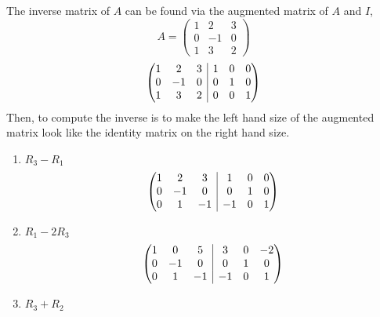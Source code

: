 \documentclass[diffeq.tex]{subfiles}
\begin{document}
    \begin{example}
        The inverse matrix of $A$ can be found via the augmented matrix of $A$ and $I$,
        \begin{equation}
            A = \begin{pmatrix}
                1 & 2 & 3\\
                0 & -1 & 0\\
                1 & 3 & 2
            \end{pmatrix}
        \end{equation}
        \begin{equation}
            \left(\begin{array}{@{}ccc|ccc@{}}
                1 & 2 & 3 & 1 & 0 & 0 \\
                0 & -1 & 0 & 0 & 1 & 0 \\
                1 & 3 & 2 & 0 & 0 & 1
                \end{array}\right)
        \end{equation}
        Then, to compute the inverse is to make the left hand size of the augmented matrix look like the identity matrix on the right hand size.
        \begin{enumerate}
            \item $R_{3} - R_{1}$
            \begin{equation}
                \left(\begin{array}{@{}ccc|ccc@{}}
                    1 & 2 & 3 & 1 & 0 & 0 \\
                    0 & -1 & 0 & 0 & 1 & 0 \\
                    0 & 1 & -1 & -1 & 0 & 1
                    \end{array}\right)
            \end{equation}
            \item $R_{1} - 2R_{3}$
            \begin{equation}
                \left(\begin{array}{@{}ccc|ccc@{}}
                    1 & 0 & 5 & 3 & 0 & -2 \\
                    0 & -1 & 0 & 0 & 1 & 0 \\
                    0 & 1 & -1 & -1 & 0 & 1
                    \end{array}\right)
            \end{equation}
            \item $R_{3} + R_{2}$
            \begin{equation}

\end{equation}
\end{enumerate}
\end{example}
\end{document}
